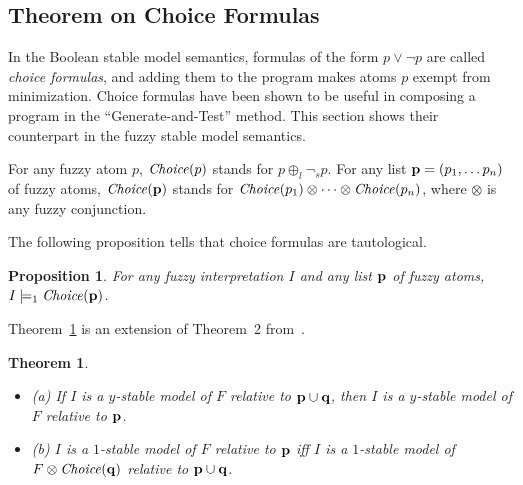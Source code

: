 \documentclass[runningheads]{llncs}
\def\bi{\begin{itemize}}
\def\ei{\end{itemize}}
\def\i#1{\hbox{\it #1\/}}
\def\i#1{\hbox{\itshape #1\/}}
\def\fand{\otimes}
\def\for{\oplus}
\newtheorem{prop}{Proposition}
\newtheorem{thm}{Theorem}
\begin{document}
\subsection{Theorem on Choice Formulas} 

In the Boolean stable model semantics, formulas of the form $p\lor\neg p$
are called {\em choice formulas}, and adding them to the program makes 
atoms $p$ exempt from minimization. Choice formulas have been shown to
be useful in composing a program in the ``Generate-and-Test'' method.
This section shows their counterpart in the fuzzy stable model semantics. 

For any fuzzy atom $p$, $\i{Choice}(p)$ stands for 
$p\for_l \neg_{\!s} p$.
For any list ${\bf p}=(p_1,\dots p_n)$ of fuzzy atoms,
$\i{Choice}({\bf p})$ stands for 
$\i{Choice}(p_1)\fand\dots\fand\i{Choice}(p_n)$,
where $\fand$ is any fuzzy conjunction. 

The following proposition tells that choice formulas are
tautological. 

\begin{prop}\label{lem_choice_tautology}
For any fuzzy interpretation $I$ and any list ${\bf p}$ of fuzzy
atoms, \hbox{$I\models_1\i{Choice}({\bf p})$}.
\end{prop}


Theorem~\ref{thm:choice} is an extension of Theorem~2
from~\cite{ferraris11stable}. %

\begin{thm} \label{thm:choice}
\bi
\item[(a)] If $I$ is a $y$-stable model of $F$ relative to ${\bf
    p}\cup {\bf q}$, then $I$ is a $y$-stable model of $F$ relative to
  ${\bf p}$.
\item[(b)] $I$ is a $1$-stable model of $F$ relative to ${\bf p}$ iff 
   $I$ is a $1$-stable model of $F\fand\i{Choice}({\bf q})$ relative
   to ${\bf p}\cup {\bf q}$.
\ei
\end{thm}
\end{document}
